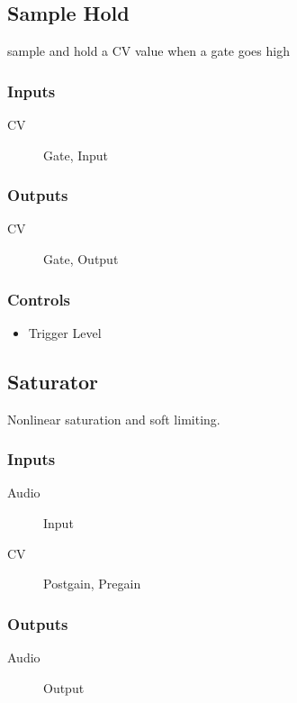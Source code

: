 \subsection{Sample Hold}

sample and hold a CV value when a gate goes high



\subsubsection{Inputs}
\begin{description}
\item [CV] Gate, Input
\end{description}

\subsubsection{Outputs}
\begin{description}
\item [CV] Gate, Output
\end{description}

\subsubsection{Controls}
\begin{itemize}
\item Trigger Level
\end{itemize}

\subsection{Saturator}

Nonlinear saturation and soft limiting.



\subsubsection{Inputs}
\begin{description}
\item [Audio] Input
\item [CV] Postgain, Pregain
\end{description}

\subsubsection{Outputs}
\begin{description}
\item [Audio] Output
\end{description}

